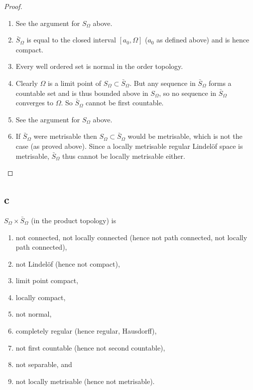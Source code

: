 \begin{proof}
  \begin{enumerate}[leftmargin=*]
  \item See the argument for $S_\Omega$ above.
  \item $\bar S_\Omega$ is equal to the closed interval $[a_0, \Omega]$ ($a_0$ as defined above) and is hence compact.
  \item Every well ordered set is normal in the order topology.
  \item Clearly $\Omega$ is a limit point of $S_\Omega \subset \bar S_\Omega$. But any sequence in $\bar S_\Omega$ forms a countable set and is thus bounded above in $S_\Omega$, so no sequence in $\bar S_\Omega$ converges to $\Omega$. So $\bar S_\Omega$ cannot be first countable.
  \item See the argument for $S_\Omega$ above.
  \item If $\bar S_\Omega$ were metrisable then $S_\Omega \subset \bar S_\Omega$ would be metrisable, which is not the case (as proved above). Since a locally metrisable regular Lindel\"of space is metrisable, $\bar S_\Omega$ thus cannot be locally metrisable either. \qedhere
  \end{enumerate}
\end{proof}


\subsection*{c}
  $S_\Omega \times \bar S_\Omega$ (in the product topology) is
  \begin{enumerate}
  \item not connected, not locally connected (hence not path connected, not locally path connected),
  \item not Lindel\"of (hence not compact),
  \item limit point compact,
  \item locally compact,
  \item not normal,
  \item completely regular (hence regular, Hausdorff),
  \item not first countable (hence not second countable),
  \item not separable, and
  \item not locally metrisable (hence not metrisable).
  \end{enumerate}

